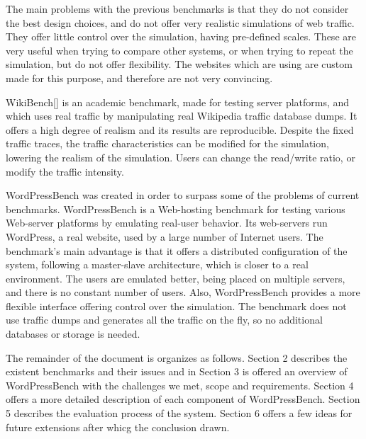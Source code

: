 The main problems with the previous benchmarks is that they do not consider the best design choices, and do not offer very realistic simulations of web traffic. They offer little control over the simulation, having pre-defined scales. These are very useful when trying to compare other systems, or when trying to repeat the simulation, but do not offer flexibility. The websites which are using are custom made for this purpose, and therefore are not very convincing. 

WikiBench[] is an academic  benchmark, made for testing server platforms, and which uses real traffic by manipulating real Wikipedia traffic database dumps. It offers a high degree of realism and its results are reproducible. Despite the fixed traffic traces, the traffic characteristics can be modified for the simulation, lowering the realism of the simulation. Users can change the read/write ratio, or modify the traffic intensity.

WordPressBench was created in order to surpass some of the problems of current benchmarks. WordPressBench is a Web-hosting benchmark for testing various Web-server platforms by emulating real-user behavior. Its web-servers run WordPress, a real website, used by a large number of Internet users. The benchmark's main advantage is that it offers a distributed configuration of the system, following a master-slave architecture, which is closer to a real environment. The users are emulated better, being placed on multiple servers, and there is no constant number of users. Also, WordPressBench provides a more flexible interface offering control over the simulation. The benchmark does not use traffic dumps and generates all the traffic on the fly, so no additional databases or storage is needed.

The remainder of the document is organizes as follows. Section 2 describes the existent benchmarks and their issues and in Section 3 is offered an overview of WordPressBench with the challenges we met, scope and requirements. Section 4 offers a more detailed description of each component of  WordPressBench. Section 5 describes the evaluation process of the system.
Section 6 offers a few ideas for future extensions after whicg the conclusion drawn.

